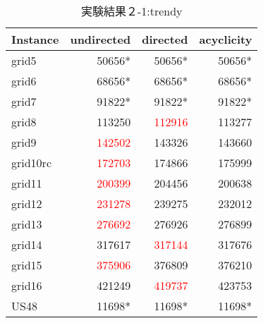 \begin{table}[htbp]
  \caption{実験結果２-1:trendy}
  \label{min_table_tr}
  \centering
  \begin{tabular}{|l|rrr|}
    \hline
    Instance&undirected&directed&acyclicity \\
    \hline
    grid5&50656*&50656*&50656* \\
    grid6&68656*&68656*&68656* \\
    grid7&91822*&91822*&91822* \\
grid8&113250&\textcolor{red}{112916}&113277 \\
grid9&\textcolor{red}{142502}&143326&143660 \\
grid10rc&\textcolor{red}{172703}&174866&175999 \\
grid11&\textcolor{red}{200399}&204456&200638 \\
grid12&\textcolor{red}{231278}&239275&232012 \\
grid13&\textcolor{red}{276692}&276926&276899 \\
grid14&317617&\textcolor{red}{317144}&317676 \\
grid15&\textcolor{red}{375906}&376809&376210 \\
grid16&421249&\textcolor{red}{419737}&423753 \\
US48&11698*&11698*&11698* \\
    \hline
  \end{tabular}
\end{table}
